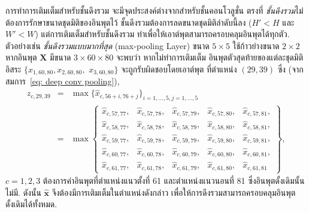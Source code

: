 การทำการเติมเต็มสำหรับชั้นดึงรวม จะมีจุดประสงค์ต่างจากสำหรับชั้นคอนโวลูชั่น
ตรงที่ 
\textit{ชั้นดึงรวม}ไม่ต้องการรักษาขนาดชุดมิติของอินพุตไว้ 
ชั้นดึงรวมต้องการลดขนาดชุดมิติลำดับนี้ลง ($H' < H$ และ $W' < W$)
แต่การเติมเต็มสำหรับชั้นดึงรวม ทำเพื่อให้เอาต์พุตสามารถครอบคลุมอินพุตได้ทุกตัว.
ตัวอย่างเช่น
\textit{ชั้นดึงรวมแบบมากที่สุด} (max-pooling Layer) ขนาด $5 \times 5$
ใช้ก้าวย่างขนาด $2 \times 2$
หากอินพุต $\bm{X}$ มีขนาด $3 \times 60 \times 80$
จะพบว่า 
หากไม่ทำการเติมเต็ม
อินพุตตัวสุดท้ายของแต่ละชุดมิติอิสระ $\{x_{1,60,80}, x_{2,60,80},$ $x_{3,60,80} \}$ 
จะถูกรับผิดชอบโดยเอาต์พุต ที่ตำแหน่ง $(29, 39)$ ซึ่ง (จากสมการ~\ref{eq: deep conv pooling}),
\begin{eqnarray}
z_{c,29,39} &=& \max \{ \hat{x}_{c, 56+i, 76+j} \}_{i=1,\ldots, 5, j=1,\ldots, 5}   
\nonumber \\
&=& \max \left\{
\begin{array}{lllll}
\hat{x}_{c, 57, 77}, & \hat{x}_{c, 57, 78}, & \hat{x}_{c, 57, 79}, & \hat{x}_{c, 57, 80}, & \hat{x}_{c, 57, 81},
\\
\hat{x}_{c, 58, 77}, & \hat{x}_{c, 58, 78}, & \hat{x}_{c, 58, 79}, & \hat{x}_{c, 58, 80}, & \hat{x}_{c, 58, 81},
\\
\hat{x}_{c, 59, 77}, & \hat{x}_{c, 59, 78}, & \hat{x}_{c, 59, 79}, & \hat{x}_{c, 59, 80}, & \hat{x}_{c, 59, 81},
\\
\hat{x}_{c, 60, 77}, & \hat{x}_{c, 60, 78}, & \hat{x}_{c, 60, 79}, & \hat{x}_{c, 60, 80}, & \hat{x}_{c, 60, 81},
\\
\hat{x}_{c, 61, 77}, & \hat{x}_{c, 61, 78}, & \hat{x}_{c, 61, 79}, & \hat{x}_{c, 61, 80}, & \hat{x}_{c, 61, 81} 
\end{array}
\right\}
\nonumber ,
\end{eqnarray}
$c = 1, 2, 3$
ต้องการค่าอินพุตที่ตำแหน่งแนวตั้งที่ 61 และตำแหน่งแนวนอนที่ 81 ซึ่งอินพุตดั้งเดิมนั้นไม่มี.
ดังนั้น $\bm{\hat{x}}$ จึงต้องมีการเติมเต็มในตำแหน่งดังกล่าว เพื่อให้การดึงรวมสามารถครอบคลุมอินพุตดั้งเดิมได้ทั้งหมด.

